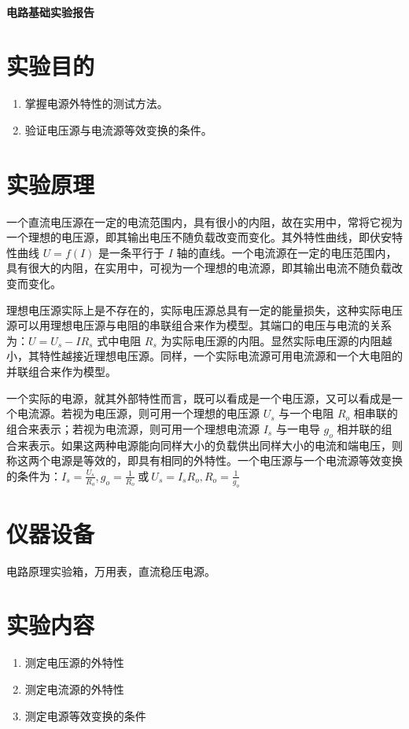 \documentclass[a4paper,utf8]{article}
\begin{document}
\begin{center}
    {\mbox{}\\[7em]\bfseries\songti%
    电路基础实验报告}\\[34mm]
    \pointingbox
\end{center}
\newpage
\section{实验目的}
\begin{enumerate}
    \item 掌握电源外特性的测试方法。
    \item 验证电压源与电流源等效变换的条件。
\end{enumerate}

\section{实验原理}%
        一个直流电压源在一定的电流范围内，具有很小的内阻，故在实用中，常将它视为一个理想的电压源，即其输出电压不随负载改变而变化。其外特性曲线，即伏安特性曲线 $U=f(I)$ 是一条平行于 $I$ 轴的直线。一个电流源在一定的电压范围内，具有很大的内阻，在实用中，可视为一个理想的电流源，即其输出电流不随负载改变而变化。\par
        理想电压源实际上是不存在的，实际电压源总具有一定的能量损失，这种实际电压源可以用理想电压源与电阻的串联组合来作为模型。其端口的电压与电流的关系为：$U=U_s-IR_s$ 式中电阻 $R_s$ 为实际电压源的内阻。显然实际电压源的内阻越小，其特性越接近理想电压源。同样，一个实际电流源可用电流源和一个大电阻的并联组合来作为模型。\par
        一个实际的电源，就其外部特性而言，既可以看成是一个电压源，又可以看成是一个电流源。若视为电压源，则可用一个理想的电压源 $U_s$ 与一个电阻 $R_o$ 相串联的组合来表示；若视为电流源，则可用一个理想电流源 $I_s$ 与一电导 $g_o$ 相并联的组合来表示。如果这两种电源能向同样大小的负载供出同样大小的电流和端电压，则称这两个电源是等效的，即具有相同的外特性。一个电压源与一个电流源等效变换的条件为：$I_s=\frac{U_s}{R_o},g_o=\frac{1}{R_o} ~\text{或}~ U_s=I_s R_o,R_o=\frac{1}{g_o}$


\section{仪器设备}
    电路原理实验箱，万用表，直流稳压电源。

\section{实验内容}
    \begin{enumerate}
        \item 测定电压源的外特性
        \item 测定电流源的外特性
        \item 测定电源等效变换的条件
    \end{enumerate}
\end{document}
